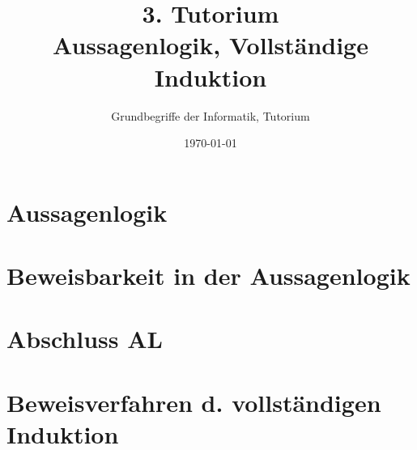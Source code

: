 




\title[Aussagenlogik, Vollständige Induktion]{3. Tutorium\\ Aussagenlogik, Vollständige Induktion}
\subtitle{Grundbegriffe der Informatik, Tutorium \hashtag\mytutnumber}
\date{\today}
\usepackage{tikz}


\titleframe


% 

\roadmap

\section{Aussagenlogik}



\section{Beweisbarkeit in der Aussagenlogik}



\section{Abschluss AL}



\section[Vollständige Induktion]{Beweisverfahren d. vollständigen Induktion}






